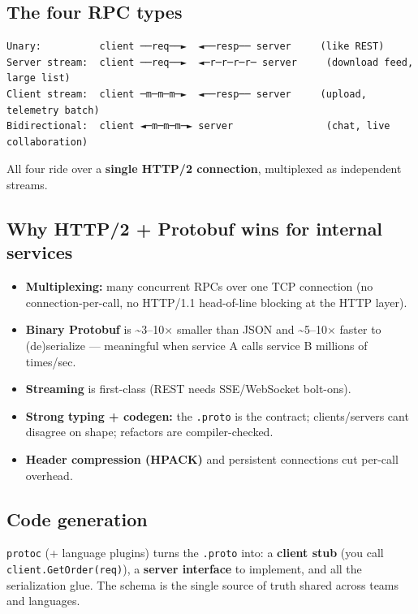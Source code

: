 \documentclass[11pt]{article}
\providecommand{\tightlist}{\setlength{\itemsep}{1pt}\setlength{\parskip}{0pt}}
\begin{document}
\subsection{The four RPC types}\label{the-four-rpc-types}

\setcodelang{}

\begin{verbatim}
Unary:          client ──req──►  ◄──resp── server     (like REST)
Server stream:  client ──req──►  ◄─r─r─r─r─ server     (download feed, large list)
Client stream:  client ─m─m─m─►  ◄──resp── server     (upload, telemetry batch)
Bidirectional:  client ◄─m─m─m─► server                (chat, live collaboration)
\end{verbatim}

All four ride over a \textbf{single HTTP/2 connection}, multiplexed as independent streams.

\subsection{Why HTTP/2 + Protobuf wins for internal services}\label{why-http2--protobuf-wins-for-internal-services}

\begin{itemize}
\tightlist
\item
  \textbf{Multiplexing:} many concurrent RPCs over one TCP connection (no connection-per-call, no HTTP/1.1 head-of-line blocking at the HTTP layer).
\item
  \textbf{Binary Protobuf} is \textasciitilde3--10\(\times\) smaller than JSON and \textasciitilde5--10\(\times\) faster to (de)serialize --- meaningful when service A calls service B millions of times/sec.
\item
  \textbf{Streaming} is first-class (REST needs SSE/WebSocket bolt-ons).
\item
  \textbf{Strong typing + codegen:} the \texttt{.proto} is the contract; clients/servers can\textquotesingle t disagree on shape; refactors are compiler-checked.
\item
  \textbf{Header compression (HPACK)} and persistent connections cut per-call overhead.
\end{itemize}

\subsection{Code generation}\label{code-generation}

\texttt{protoc} (+ language plugins) turns the \texttt{.proto} into: a \textbf{client stub} (you call \texttt{client.GetOrder(req)}), a \textbf{server interface} to implement, and all the serialization glue. The schema is the single source of truth shared across teams and languages.
\end{document}
